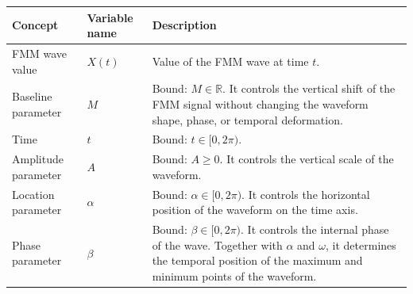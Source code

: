 \documentclass[a4paper]{article}
\title{}
\date{}
\author{Mohammad Rahmani}
\begin{document}
   \maketitle
   \begin{table}[H]

      \centering

      \small

      \setlength{\tabcolsep}{4pt}

      \begin{tabular}{p{} p{} p{}}

         \hline

         \textbf{Concept} & \textbf{Variable name} & \textbf{Description} \\

         \hline

         FMM wave value

         & $X(t)$

         & Value of the FMM wave at time $t$. \\

         Baseline parameter

         & $M$

         & Bound: $M \in \mathbb{R}$. It controls the vertical shift of the FMM signal without changing the waveform shape, phase, or temporal deformation. \\

         Time

         & $t$

         & Bound: $t \in [0, 2\pi)$. \\

         Amplitude parameter

         & $A$

         & Bound: $A \geq 0$. It controls the vertical scale of the waveform. \\

         Location parameter

         & $\alpha$

         & Bound: $\alpha \in [0, 2\pi)$. It controls the horizontal position of the waveform on the time axis. \\

         Phase parameter

         & $\beta$

         & Bound: $\beta \in [0, 2\pi)$. It controls the internal phase of the wave. Together with $\alpha$ and $\omega$, it determines the temporal position of the maximum and minimum points of the waveform. \\


\end{tabular}
\end{table}
\end{document}
